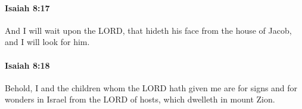 		\paragraph{Isaiah 8:17} %
			\label{ISAIAH-8-17}

			And I will wait upon the LORD, that hideth his face from the house of Jacob, and I will look for him.


		\paragraph{Isaiah 8:18} %
			\label{ISAIAH-8-18}

			Behold, I and the children whom the LORD hath given me are for signs and for wonders in Israel from the LORD of hosts, which dwelleth in mount Zion.


